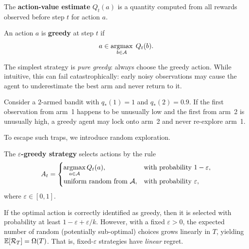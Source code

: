 \begin{definition}
\label{def:action-value-estimate}
The \textbf{action-value estimate} $Q_t(a)$ is a quantity computed from all rewards observed before step $t$ for action $a$.
\end{definition}

\begin{definition}
\label{def:greedy-action}
An action $a$ is \textbf{greedy} at step $t$ if
\begin{equation}
\label{eq:greedy-action}
a \in \operatorname*{argmax}_{b\in\mathcal{A}}\; Q_t(b).
\end{equation}
\end{definition}

The simplest strategy is \emph{pure greedy}: always choose the greedy action.  While intuitive, this can fail catastrophically: early noisy observations may cause the agent to underestimate the best arm and never return to it.

\begin{example}
\label{ex:greedy-stuck}
Consider a $2$-armed bandit with $q_*(1)=1$ and $q_*(2)=0.9$.  If the first observation from arm~1 happens to be unusually low and the first from arm~2 is unusually high, a greedy agent may lock onto arm~2 and never re-explore arm~1.
\end{example}

To escape such traps, we introduce random exploration.

\begin{definition}
\label{def:eps-greedy}
The \textbf{$\varepsilon$-greedy strategy} selects actions by the rule
\begin{equation}
\label{eq:eps-greedy}
A_t =
\begin{cases}
\displaystyle\operatorname*{argmax}_{a\in\mathcal{A}}Q_t(a), & \text{with probability } 1-\varepsilon,\\[6pt]
\text{uniform random from }\mathcal{A}, & \text{with probability } \varepsilon,
\end{cases}
\end{equation}
where $\varepsilon\in[0,1]$.
\end{definition}

\begin{remark}
\label{rem:eps-greedy-regret}
If the optimal action is correctly identified as greedy, then it is selected with probability at least $1-\varepsilon+\varepsilon/k$.  However, with a fixed $\varepsilon>0$, the expected number of random (potentially sub-optimal) choices grows linearly in $T$, yielding $\operatorname{\mathbb{E}}[\mathcal{R}_T]=\Omega(T)$.  That is, fixed-$\varepsilon$ strategies have \emph{linear} regret.
\end{remark}


